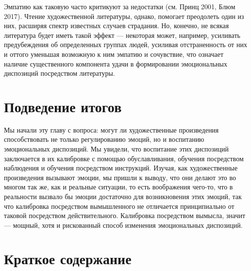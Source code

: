 \documentclass[11pt]{book}
\begin{document}
Эмпатию как таковую часто критикуют за недостатки (см. Принц 2001, Блюм 2017). Чтение художественной литературы, однако, помогает преодолеть один из них, расширяя спектр известных случаев страдания. Но, конечно, не всякая литература будет иметь такой эффект --- некоторая может, например, усиливать предубеждения об определенных группах людей, усиливая отстраненность от них и оттого уменьшая возможную к ним эмпатию и сочувствие, что означает наличие существенного компонента удачи в формировании эмоциональных диспозиций посредством литературы.

\section{Подведение итогов}

Мы начали эту главу с вопроса: могут ли художественные произведения способствовать не только регулированию эмоций, но и воспитанию эмоциональных диспозиций. Мы увидели, что воспитание этих диспозиций заключается в их калибровке с помощью обуславливания, обучения посредством наблюдения и обучения посредством инструкций. Изучая, как художественные произведения вызывают эмоции, мы пришли к выводу, что они делают это во многом так же, как и реальные ситуации, то есть воображения чего-то, что в реальности вызвало бы эмоции достаточно для возникновения этих эмоций, так что калибровка посредством вымышленного не отличается принципиально от таковой посредством действительного. Калибровка посредством вымысла, значит --- мощный, хотя и рискованный способ изменения эмоциональных диспозиций.

\section{Краткое содержание}
\end{document}
